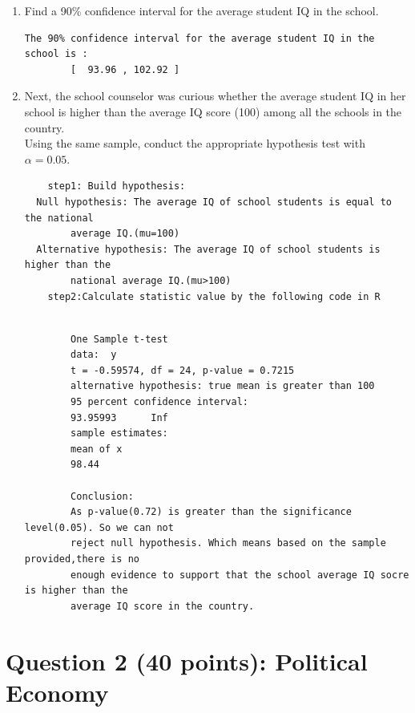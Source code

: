 \documentclass[12pt,letterpaper]{article}
\begin{document}
\begin{enumerate}
	\item Find a 90\% confidence interval for the average student IQ in the school.\\
	
	
	
	\begin{verbatim}The 90% confidence interval for the average student IQ in the school is :
		[  93.96 , 102.92 ]\end{verbatim}
	
	\item Next, the school counselor was curious  whether  the average student IQ in her school is higher than the average IQ score (100) among all the schools in the country.\\ 
	

	\noindent Using the same sample, conduct the appropriate hypothesis test with $\alpha=0.05$.
	\begin{verbatim}
	step1: Build hypothesis:
  Null hypothesis: The average IQ of school students is equal to the national 
		average IQ.(mu=100)
  Alternative hypothesis: The average IQ of school students is higher than the 
		national average IQ.(mu>100)
	step2:Calculate statistic value by the following code in R
	
	\end{verbatim}
	
		
	
	\begin{verbatim}	
		One Sample t-test
		data:  y
		t = -0.59574, df = 24, p-value = 0.7215
		alternative hypothesis: true mean is greater than 100
		95 percent confidence interval: 
		93.95993      Inf
		sample estimates:
		mean of x     
		98.44 
		
		Conclusion:
		As p-value(0.72) is greater than the significance level(0.05). So we can not 
		reject null hypothesis. Which means based on the sample provided,there is no 
		enough evidence to support that the school average IQ socre is higher than the 
		average IQ score in the country.
	\end{verbatim}
	
\end{enumerate}

\newpage

	\section*{Question 2 (40 points): Political Economy}
\end{document}
